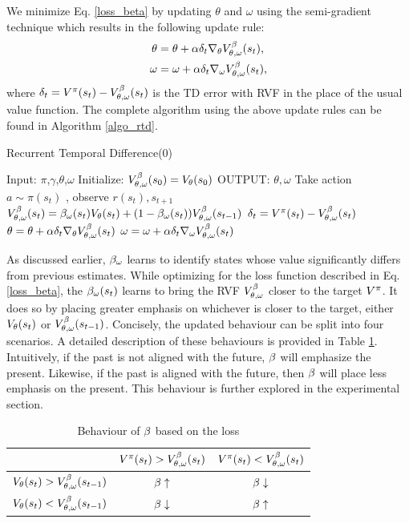 We minimize Eq. \ref{loss_beta} by updating $\theta$ and $\omega$ using the semi-gradient technique which results in the following update rule:
\begin{equation}
\begin{split}
	\theta &= \theta + \alpha \delta_t  \nabla_{\theta} V^{\beta}_{\theta, \omega} (s_t), \\
	\omega &= \omega + \alpha \delta_t  \nabla_{\omega} V^{\beta}_{\theta, \omega} (s_t),
\end{split}
\end{equation}
where $\delta_t = V^{\pi}(s_t) - V^{\beta}_{\theta, \omega}(s_t)$ is the TD error with RVF in the place of the usual value function. The complete algorithm using the above update rules can be found in Algorithm \ref{algo_rtd}.

\begin{algorithm}[H]
\caption{Recurrent Temporal Difference(0)}
\begin{algorithmic}[1]
    \label{RTD}
    \STATE Input: $\pi$,$\gamma$,$\theta$,$\omega$
    \STATE Initialize: $V^{\beta}_{\theta, \omega}(s_0) = V_{\theta}(s_0)$
    \STATE OUTPUT: $\theta,\omega$ 
        \STATE Take action $a \sim \pi(s_t)$ , observe $r(s_t),s_{t+1}$
        \STATE $V^{\beta}_{\theta, \omega}(s_t) = \beta_{\omega}(s_t) V_{\theta}(s_t) + (1-\beta_{\omega}(s_t)) V^{\beta}_{\theta, \omega} (s_{t-1})$ 
        \STATE $\delta_t = V^{\pi}(s_t) - V^{\beta}_{\theta, \omega}(s_t)$ 
        \STATE $\theta = \theta + \alpha \delta_t \nabla_{\theta} V^{\beta}_{\theta, \omega}(s_t) $ 
        \STATE $\omega = \omega + \alpha \delta_t \nabla_{\omega} V^{\beta}_{\theta, \omega}(s_t)$ 
    \ENDFOR
\end{algorithmic}
\label{algo_rtd}
\end{algorithm}

As discussed earlier, $\beta_{\omega}$ learns to identify states whose value significantly differs from previous estimates. While optimizing for the loss function described in Eq. \ref{loss_beta}, the $\beta_{\omega}(s_t)$ learns to bring the RVF $V^{\beta}_{\theta, \omega}$ closer to the target $V^{\pi}$. It does so by placing greater emphasis on whichever is closer to the target, either $V_{\theta}(s_t)$ or $V^{\beta}_{\theta, \omega}(s_{t-1})$. Concisely, the updated behaviour can be split into four scenarios. A detailed description of these behaviours is provided in Table \ref{sample-table}. Intuitively, if the past is not aligned with the future, $\beta$ will emphasize the present. Likewise, if the past is aligned with the future, then $\beta$ will place less emphasis on the present. This behaviour is further explored in the experimental section.

\begin{table}[h]
\caption{Behaviour of $\beta$ based on the loss}
\centering
\begin{tabular}{c|c c } 
  & \small{$V^{\pi}(s_t)>V^{\beta}_{\theta, \omega}(s_t)$} & \small{$V^{\pi}(s_t)<V^{\beta}_{\theta, \omega}(s_t)$} \\ 
   \hline
 \small{$V_{\theta}(s_t)>V^{\beta}_{\theta, \omega}(s_{t-1})$} & $\beta \uparrow$ &  $\beta \downarrow$ \\ 
 \small{$V_{\theta}(s_t)<V^{\beta}_{\theta, \omega}(s_{t-1})$} & $\beta \downarrow$ & $\beta \uparrow$  \\ 
\end{tabular}
\vspace{7pt}
\label{sample-table}
\end{table}

